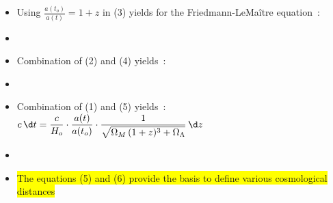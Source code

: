 \Tr
\begin{itemize}
\item Using {\blue $\displaystyle \frac{a(t_{o})}{a(t)}=1+z$} in (3) yields for the Friedmann-LeMa\^{i}tre equation~:
\item[] \begin{center}
        {\red {}}
        \end{center}
\item Combination of (2) and (4) yields~:
\item[] \begin{center}
        {\blue {}}
        \end{center}
\item Combination of (1) and (5) yields~:
        $\displaystyle c\,\d t=
         \frac{c}{H_{o}}\cdot\frac{a(t)}{a(t_{o})}\cdot\frac{1}{\sqrt{\Omega_{M}\,(1+z)^{3}+\Omega_{\Lambda}}}\,\d z$
\item[] \begin{center}
        {\blue {}}
        \end{center}
\item[] \colorbox{yellow}{The equations (5) and (6) provide the basis to define various cosmological distances}
\end{itemize}

